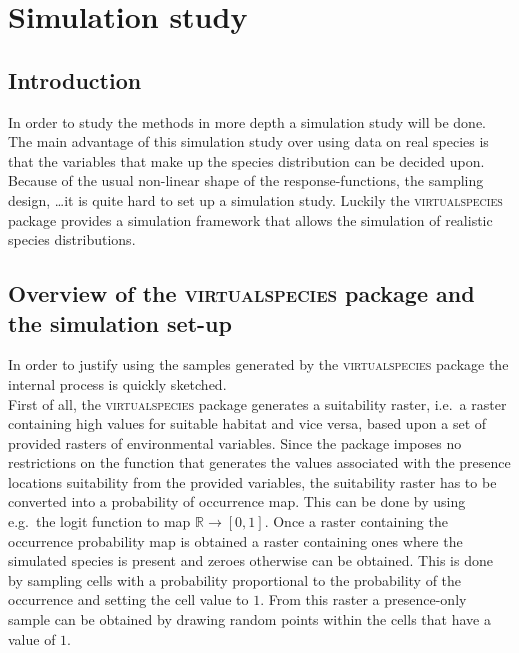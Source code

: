 \chapter{Simulation study}
\label{chap:SimulationStudy}

\section{Introduction}
In order to study the methods in more depth a simulation study will be done. The main advantage of this simulation study over using data on real species is that the variables that make up the species distribution can be decided upon. Because of the usual non-linear shape of the response-functions, the sampling design, \dots it is quite hard to set up a simulation study. Luckily the
\textsc{virtualspecies} package \parencite{virtualspecies, leroy2015virtualspecies} provides a simulation framework that allows the simulation of realistic species distributions. \\

\section{Overview of the \textsc{virtualspecies} package and the simulation set-up}
\label{sec:SimSetUp}
In order to justify using the samples generated by the \textsc{virtualspecies} package the internal process is quickly sketched. \\

First of all, the \textsc{virtualspecies} package generates a suitability raster, i.e.\ a raster containing high values for suitable habitat and vice versa, based upon a set of provided rasters of environmental variables. Since the package imposes no restrictions on the function that generates the values associated with the presence locations suitability from the provided variables, the suitability raster has to be converted into a probability of occurrence map. This can be done by using e.g.\ the logit function to map $\mathbb{R} \to [0,1]$. Once a raster containing the occurrence probability map is obtained a raster containing ones where the simulated species is present and zeroes otherwise can be obtained. This is done by sampling cells with a probability proportional to the probability of the occurrence and setting the cell value to $1$. From this raster a presence-only sample can be obtained by drawing random points within the cells that have a value of $1$.\\

